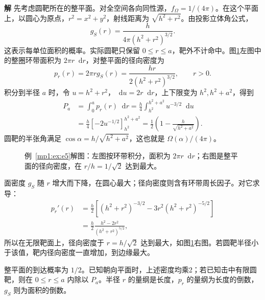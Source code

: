 \documentclass[11pt,openany,fontset=fandol]{ctexbook}
\theoremstyle{definition}\newtheorem{example}{例}[chapter]\newtheorem{exercise}{习题}[chapter]
\newcommand{\SolutionStart}{\par\medskip\ifdim\pagetotal>0pt\ifdim\dimexpr\pagegoal-\pagetotal\relax<3\baselineskip\newpage\fi\fi\noindent\textbf{解}\quad\ignorespaces}
\newenvironment{solution}{\SolutionStart}{\par\medskip}
\newcommand{\dd}{\mathop{}\!\mathrm d}\newcommand{\ee}{\mathrm e}\newcommand{\vct}[1]{\bm{#1}}
\begin{document}
\begin{solution}
先考虑圆靶所在的整平面。对全空间各向同性源，$f_\Omega=1/(4\pi)$。在这个平面上，以圆心为原点，$r^2=x^2+y^2$，射线距离为 $\sqrt{h^2+r^2}$。由投影立体角公式，
\begin{equation}\label{mp1:eq:isotropic-plane}
g_S(r)=\frac h{4\pi(h^2+r^2)^{3/2}}.
\end{equation}
这表示每单位面积的概率。实际圆靶只保留 $0\le r\le a$，靶外不计命中。图\ref{mp1:fig:e5-s}左图中的整圈环带面积为 $2\pi r\dd r$，对整平面的径向密度为
\[
p_r(r)=2\pi r g_S(r)=\frac{hr}{2(h^2+r^2)^{3/2}},\qquad r>0.
\]
积分到半径 $a$ 时，令 $u=h^2+r^2$，$\dd u=2r\dd r$，上下限变为 $h^2,h^2+a^2$，得到
\begin{align*}
P_a&=\int_0^a p_r(r)\dd r
=\frac h4\int_{h^2}^{h^2+a^2}u^{-3/2}\dd u\\
&=\frac h4\left[-2u^{-1/2}\right]_{h^2}^{h^2+a^2}
=\frac12\left(1-\frac h{\sqrt{h^2+a^2}}\right).
\end{align*}
圆靶的半张角满足 $\cos\alpha=h/\sqrt{h^2+a^2}$，这也就是 $\Omega(\alpha)/(4\pi)$。

\begin{figure}[H]\centering

\caption{例~\ref{mp1:ex:e5}解图：左图按环带积分，面积为 $2\pi r\dd r$；右图是整平面的径向密度，在 $r/h=1/\sqrt2$ 达到最大。}\label{mp1:fig:e5-s}
\end{figure}

面密度 $g_S$ 随 $r$ 增大而下降，在圆心最大；径向密度则含有环带周长因子。对它求导：
\[
\begin{aligned}
p_r'(r)&=\frac h2\left[(h^2+r^2)^{-3/2}
-3r^2(h^2+r^2)^{-5/2}\right]\\
&=\frac h2\frac{h^2-2r^2}{(h^2+r^2)^{5/2}},
\end{aligned}
\]
所以在无限靶面上，径向密度于 $r=h/\sqrt2$ 达到最大，如图\ref{mp1:fig:e5-s}右图。若圆靶半径小于该值，靶内径向密度一直增加，到边缘最大。

整平面的到达概率为 $1/2$。已知朝向平面时，上述密度均乘2；若已知击中有限圆靶，则在 $0\le r\le a$ 内除以 $P_a$。半径 $r$ 的量纲是长度，$p_r$ 的量纲为长度的倒数，$g_S$ 则为面积的倒数。
\end{solution}
\end{document}
